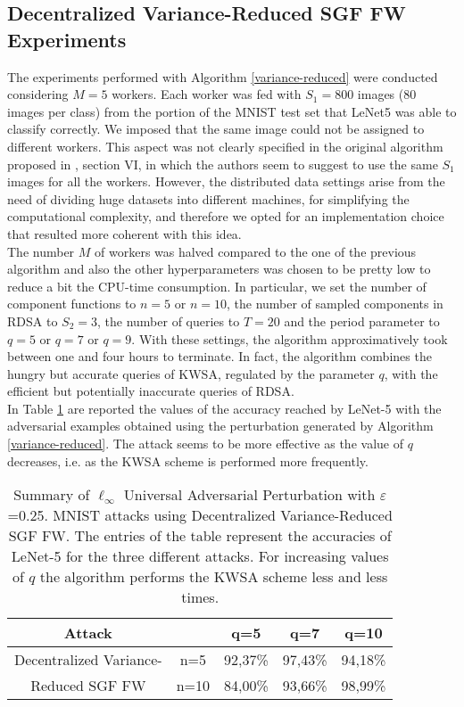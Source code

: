 \subsection{Decentralized Variance-Reduced SGF FW Experiments}
The experiments performed with Algorithm \ref{variance-reduced} were conducted considering $M=5$ workers. Each worker was fed with $S_1=800$ images (80 images per class) from the portion of the MNIST test set that LeNet5 was able to classify correctly. We imposed that the same image could not be assigned to different workers. This aspect was not clearly specified in the original algorithm proposed in \cite{A3}, section VI, in which the authors seem to suggest to use the same $S_1$ images for all the workers. However, the distributed data settings arise from the need of dividing huge datasets into different machines, for simplifying the computational complexity, and therefore we opted for an implementation choice that resulted more coherent with this idea.\\  \indent The number $M$ of workers was halved compared to the one of the previous algorithm and also the other hyperparameters was chosen to be pretty low to reduce a bit the CPU-time consumption. In particular, we set the number of component functions to $n=5$ or $n=10$, the number of sampled components in RDSA to $S_2=3$, the number of queries to $T=20$ and the period parameter to $q=5$ or $q=7$ or $q=9$. With these settings, the algorithm approximatively took between one and four hours to terminate. In fact, the algorithm combines the hungry but accurate queries of KWSA, regulated by the parameter $q$, with the efficient but potentially inaccurate queries of RDSA.\\
\indent In Table \ref{tab:vr} are reported the values of the accuracy reached by LeNet-5 with the adversarial examples obtained using the perturbation generated by Algorithm \ref{variance-reduced}. The attack seems to be more effective as the value of $q$ decreases, i.e. as the KWSA scheme is performed more frequently.\\
\begin{table}[htbp]
	\begin{center}
		\begin{adjustwidth}{-.6cm}{}
			\begin{tabular}{c|cccc}
				\textbf{Attack} &    &      q=5 &      q=7 &     q=10 \\
				\midrule
				{\small Decentralized Variance-}  & n=5   &    92,37\% &    97,43\% &       94,18\% \\
				{\small Reduced SGF FW}     &  n=10&  84,00\% &    93,66\% &       98,99\% \\
			\end{tabular}
		\end{adjustwidth}
	\end{center}
\caption{{\small Summary of $\ell_\infty$ Universal Adversarial Perturbation with $\varepsilon$=0.25. MNIST attacks using Decentralized Variance-Reduced SGF FW. The entries of the table represent the accuracies of LeNet-5 for the three different attacks. For increasing values of $q$ the algorithm performs the KWSA scheme less and less times.}}
	\label{tab:vr}
\end{table}


